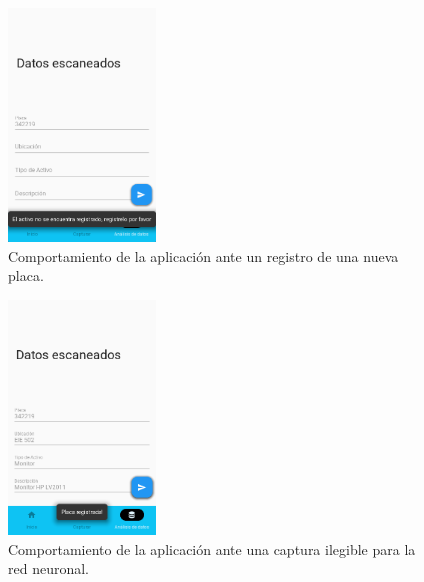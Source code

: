 \begin{figure}[H]
    \centering
    \includegraphics[width=0.35\textwidth]{imagenes/resultados/cinco.png}
    \caption{Comportamiento de la aplicación ante un registro de una nueva placa.}
    \label{r:cinco}
\end{figure}
\begin{figure}[H]
    \centering
    \includegraphics[width=0.35\textwidth]{imagenes/resultados/seis.png}
    \caption{Comportamiento de la aplicación ante una captura ilegible para la red neuronal.}
    \label{r:seis}
\end{figure}